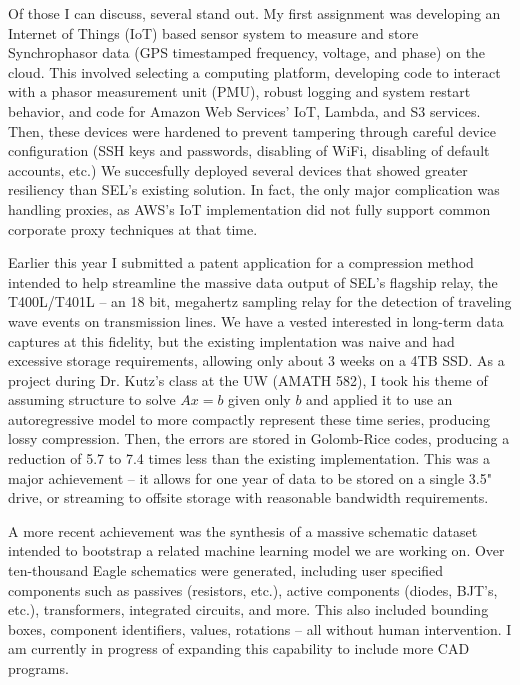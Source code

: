 \documentclass[letterpaper]{article}
\begin{document}
Of those I can discuss, several stand out. My first assignment was developing an Internet
of Things (IoT) based sensor system to measure and store Synchrophasor data (GPS timestamped
frequency, voltage, and phase) on the cloud. This involved selecting a computing platform,
developing code to interact with a phasor measurement unit (PMU), robust logging and
system restart behavior, and code for Amazon Web Services' IoT, Lambda, and S3
services. Then, these devices were hardened to prevent tampering through
careful device configuration (SSH keys and passwords, disabling of WiFi, disabling
of default accounts, etc.) We succesfully deployed several devices that showed greater
resiliency than SEL's existing solution. In fact, the only major complication was
handling proxies, as AWS's IoT implementation did not fully support common corporate
proxy techniques at that time.

Earlier this year I submitted a patent application for a compression method intended
to help streamline the massive data output of SEL's flagship relay, the T400L/T401L -- an
18 bit, megahertz sampling relay for the detection of traveling wave events on
transmission lines. We have a vested interested in long-term data captures at this
fidelity, but the existing implentation was naive and had excessive storage requirements,
allowing only about 3 weeks on a 4TB SSD. As a project during Dr. Kutz's class at the UW
(AMATH 582), I took his theme of assuming structure to solve $Ax=b$ given only $b$ and applied
it to use an autoregressive model to more compactly represent these time series,
producing lossy compression. Then, the errors are stored in Golomb-Rice codes, producing
a reduction of 5.7 to 7.4 times less than the existing implementation. This was a
major achievement -- it allows for one year of data to be stored on a single 3.5"
drive, or streaming to offsite storage with reasonable bandwidth requirements.

A more recent achievement was the synthesis of a massive schematic dataset intended to
bootstrap a related machine learning model we are working on. Over ten-thousand Eagle
schematics were generated, including user specified components such as passives
(resistors, etc.), active components (diodes, BJT's, etc.), transformers, integrated
circuits, and more. This also included bounding boxes, component identifiers, values,
rotations -- all without human intervention. I am currently in progress of expanding
this capability to include more CAD programs.
\end{document}
